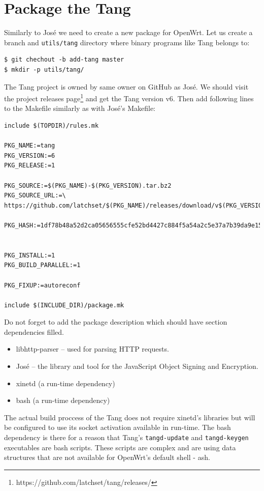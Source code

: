 \section{Package the Tang}
Similarly to José we need to create a new package for OpenWrt.
Let us create a branch and {\tt utils/tang} directory where binary programs like Tang belongs to:
\begin{lstlisting}[columns=fixed,basicstyle=\ttfamily\footnotesize,tabsize=4,backgroundcolor=\color{yellow!10}]
$ git chechout -b add-tang master
$ mkdir -p utils/tang/
\end{lstlisting}
The Tang project is owned by same owner on GitHub as José.
We should visit the project releases page\footnote{https://github.com/latchset/tang/releases/} and get the Tang version v6.
Then add following lines to the Makefile similarly as with José's Makefile:
\begin{lstlisting}[columns=fixed,basicstyle=\ttfamily\footnotesize,tabsize=4,backgroundcolor=\color{yellow!10}]
include $(TOPDIR)/rules.mk

PKG_NAME:=tang
PKG_VERSION:=6
PKG_RELEASE:=1

PKG_SOURCE:=$(PKG_NAME)-$(PKG_VERSION).tar.bz2
PKG_SOURCE_URL:=\
https://github.com/latchset/$(PKG_NAME)/releases/download/v$(PKG_VERSION)/

PKG_HASH:=1df78b48a52d2ca05656555cfe52bd4427c884f5a54a2c5e37a7b39da9e155e3


PKG_INSTALL:=1
PKG_BUILD_PARALLEL:=1

PKG_FIXUP:=autoreconf

include $(INCLUDE_DIR)/package.mk
\end{lstlisting}
Do not forget to add the package description which should have section dependencies filled.
\begin{itemize}
    \item libhttp-parser -- used for parsing HTTP requests.
    \item José -- the library and tool for the JavaScript Object Signing and Encryption.
    \item xinetd (a run-time dependency)
    \item bash (a run-time dependency)
\end{itemize}
The actual build proccess of the Tang does not require xinetd's libraries but will be configured to use its socket activation available in run-time.
The bash dependency is there for a reason that Tang's {\tt tangd-update} and {\tt tangd-keygen} executables are bash scripts.
These scripts are complex and are using data structures that are not available for OpenWrt's default shell - ash.
